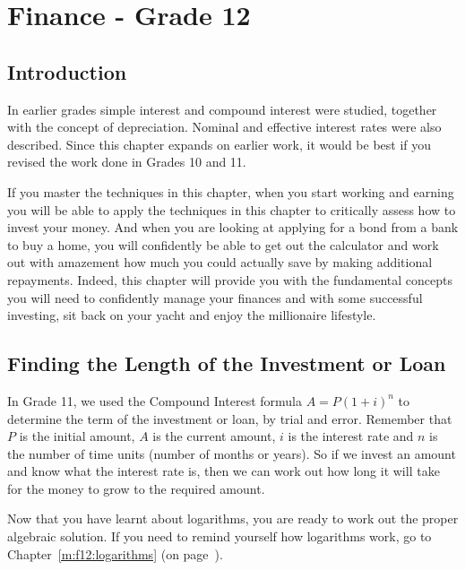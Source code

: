 \chapter{Finance - Grade 12}
\label{m:f12}

\section{Introduction}
In earlier grades simple interest and compound interest were studied, together with the concept of depreciation. Nominal and effective interest rates were also described. Since this chapter expands on earlier work, it would be best if you revised the work done in Grades 10 and 11.%

If you master the techniques in this chapter, when you start working and earning you will be able to apply the techniques in this chapter to critically assess how to invest your money. And when you are looking at applying for a bond from a bank to buy a home, you will confidently be able to get out the calculator and work out with amazement how much you could actually save by making additional repayments. Indeed, this chapter will provide you with the fundamental concepts you will need to confidently manage your finances and with some successful investing, sit back on your yacht and enjoy the millionaire lifestyle.

\section{Finding the Length of the Investment or Loan}
\label{sec:m:f12:term}


In Grade 11, we used the Compound Interest formula $A = P(1 + i)^n$ to determine the term of the investment or loan, by trial and error. Remember that $P$ is the initial amount, $A$ is the current amount, $i$ is the interest rate and $n$ is the number of time units (number of months or years). So if we invest an amount and know what the interest rate is, then we can work out how long it will take for the money to grow to the required amount.

Now that you have learnt about logarithms, you are ready to work out the proper algebraic solution. If you need to remind yourself how logarithms work, go to Chapter~\ref{m:f12:logarithms} (on page~\pageref{m:f12:logarithms}).

